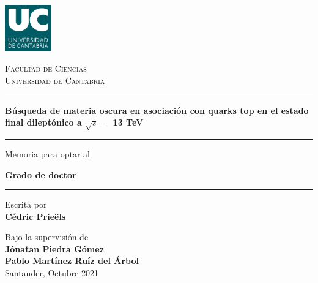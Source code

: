 \documentclass[a4paper, 10pt, openright]{report}
\begin{document}

\thispagestyle{empty}
\phantom{a}
\vfill
\newpage

\begin{titlepage}

	\centering
	\includegraphics[width=0.15\textwidth]{figs/image_UC.png}\par
	{\scshape\LARGE Facultad de Ciencias \\ \vspace{-15pt} Universidad de Cantabria \par}
	
	\vspace{0.8cm}
	
	\noindent\rule{15cm}{0.4pt}\par 
	{\huge\bfseries B\'{u}squeda de materia oscura en asociaci\'{o}n con quarks top en el estado final dilept\'{o}nico a $\sqrt{s} = $ 13 TeV\par \vspace{10pt}}
	\noindent\rule{15cm}{0.4pt}\par 
	
	{\vspace{20pt} \Large Memoria para optar al \par \LARGE \textbf{Grado de doctor} \vspace{20pt} \par \noindent\rule{15cm}{0.4pt}}
	
	\vspace{0.8cm}
	{\Large Escrita por \\ \textbf{C\'{e}dric Prie\"{e}ls}\par}
	\vspace{0.5cm}
	{\Large Bajo la supervisi\'{o}n de \\ \textbf{J\'{o}natan Piedra G\'{o}mez} \\
	\vspace{-10pt}
	\textbf{Pablo Mart\'{i}nez Ru\'{i}z del \'{A}rbol}\\}
	\vspace{2.6cm}
	{\Large Santander, Octubre 2021}
	\vfill

\end{titlepage}


\thispagestyle{empty}
\phantom{a}
\vfill
\newpage
\end{document}
